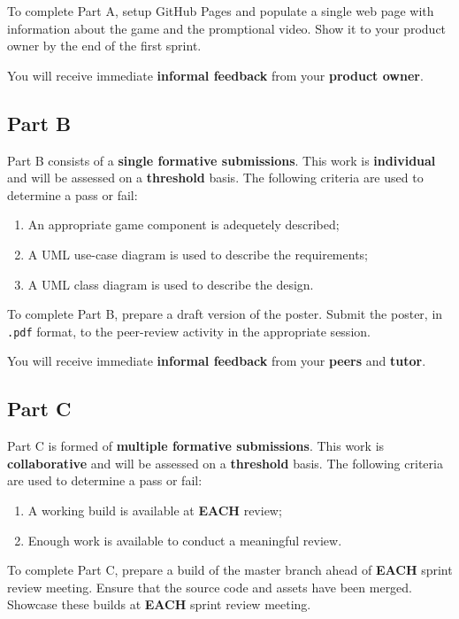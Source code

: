 \documentclass{../../fal_assignment}
\begin{document}
To complete Part A, setup GitHub Pages and populate a single web page with information about the game and the promptional video. Show it to your product owner by the end of the first sprint.

You will receive immediate \textbf{informal feedback} from your \textbf{product owner}.

\subsection*{Part B}

Part B consists of a \textbf{single formative submissions}. This work is \textbf{individual} and will be assessed on a \textbf{threshold} basis. The following criteria are used to determine a pass or fail:

\begin{enumerate}[label=(\alph*)]
	\item An appropriate game component is adequetely described;
	\item A UML use-case diagram is used to describe the requirements; 
	\item A UML class diagram is used to describe the design.
\end{enumerate}

To complete Part B, prepare a draft version of the poster. Submit the poster, in \texttt{.pdf} format, to the peer-review activity in the appropriate session.

You will receive immediate \textbf{informal feedback} from your \textbf{peers} and \textbf{tutor}.

\subsection*{Part C}

Part C is formed of \textbf{multiple formative submissions}. This work is \textbf{collaborative} and will be assessed on a \textbf{threshold} basis. The following criteria are used to determine a pass or fail:

\begin{enumerate}[label=(\alph*)]
	\item A working build is available at \textbf{EACH} review;
	\item Enough work is available to conduct a meaningful review.
\end{enumerate}

To complete Part C, prepare a build of the master branch ahead of \textbf{EACH} sprint review meeting. Ensure that the source code and assets have been merged. Showcase these builds at \textbf{EACH} sprint review meeting.
\end{document}
